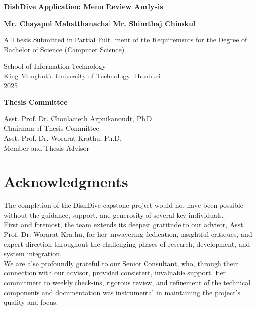 \begin{titlepage}
\centering
\vspace*{1cm}
\Huge\textbf{DishDive Application: Menu Review Analysis}

\vspace{1cm}
\Large\textbf{Mr. Chayapol Mahatthanachai}
\Large\textbf{Mr. Shinathaj Chinskul}

\vspace{2cm}
\large A Thesis Submitted in Partial Fulfillment of the Requirements for the Degree of Bachelor of Science (Computer Science)

\vspace{1cm}
\large School of Information Technology\\
King Mongkut’s University of Technology Thonburi\\
2025

\vspace{2cm}
\textbf{Thesis Committee}

\vspace{1cm}
\large Asst. Prof. Dr. Chonlameth Arpnikanondt, Ph.D.\\
Chairman of Thesis Committee\\
\large Asst. Prof. Dr. Worarat Krathu, Ph.D.\\
Member and Thesis Advisor

\end{titlepage}

\chapter*{Acknowledgments}
The completion of the DishDive capstone project would not have been possible without the guidance, support, and generosity of several key individuals.\\

First and foremost, the team extends its deepest gratitude to our advisor, Asst. Prof. Dr. Worarat Krathu, for her unwavering dedication, insightful critiques, and expert direction throughout the challenging phases of research, development, and system integration.\\

We are also profoundly grateful to our Senior Consultant, who, through their connection with our advisor, provided consistent, invaluable support. Her commitment to weekly check-ins, rigorous review, and refinement of the technical components and documentation was instrumental in maintaining the project's quality and focus.\\

